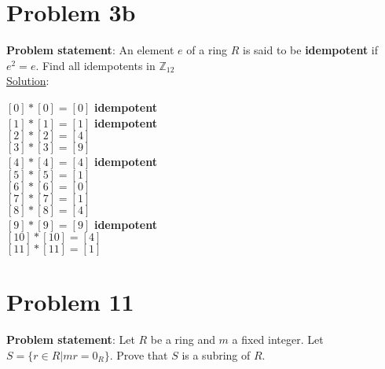 \documentclass{article} %
\begin{document}
\newpage

\section*{Problem 3b}

\textbf{Problem statement}: An element $e$ of a ring $R$ is said to be \textbf{idempotent} if $e^2 = e$.  Find all idempotents in $\mathbb{Z}_{12}$
\\


\underline{Solution}: 
\begin{addmargin}[1em]{0em}
$[0]*[0] = [0]$ \textbf{idempotent}
\\$[1]*[1] = [1]$ \textbf{idempotent}
\\$[2]*[2] = [4]$
\\$[3]*[3] = [9]$
\\$[4]*[4] = [4]$ \textbf{idempotent}
\\$[5]*[5] = [1]$
\\$[6]*[6] = [0]$
\\$[7]*[7] = [1]$
\\$[8]*[8] = [4]$
\\$[9]*[9] = [9]$ \textbf{idempotent}
\\$[10]*[10] = [4]$
\\$[11]*[11] = [1]$
\end{addmargin}

\newpage

\section*{Problem 11}


\textbf{Problem statement}: Let $R$ be a ring and $m$ a fixed integer.  Let $S = \{r \in R | mr = 0_R\}$.  Prove that $S$ is a subring of $R$.
\\
\end{document}
